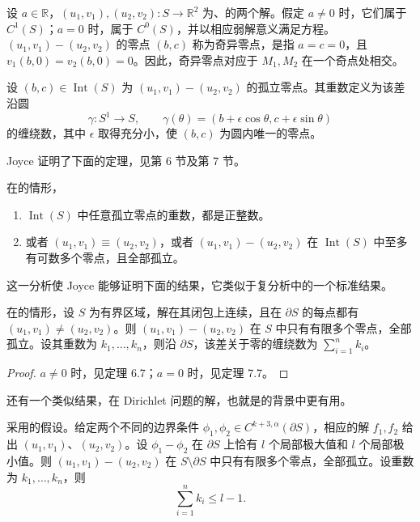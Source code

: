 \begin{definition}\label{def:7.13}
设 $a\in\mathbb R$，$(u_1,v_1),(u_2,v_2)\colon S\to\mathbb R^2$ 为、的两个解。假定 $a\neq0$ 时，它们属于 $C^1(S)$；$a=0$ 时，属于 $C^0(S)$，并以相应弱解意义满足方程。$(u_1,v_1)-(u_2,v_2)$ 的零点 $(b,c)$ 称为奇异零点，是指 $a=c=0$，且 $v_1(b,0)=v_2(b,0)=0$。因此，奇异零点对应于 $M_1,M_2$ 在一个奇点处相交。

设 $(b,c)\in\operatorname{Int}(S)$ 为 $(u_1,v_1)-(u_2,v_2)$ 的孤立零点。其重数定义为该差沿圆
\[
\gamma\colon S^1\longrightarrow S,\qquad
\gamma(\theta)=(b+\epsilon\cos\theta,c+\epsilon\sin\theta)
\]
的缠绕数，其中 $\epsilon$ 取得充分小，使 $(b,c)$ 为圆内唯一的零点。
\end{definition}

Joyce 证明了下面的定理，见第 6 节及第 7 节。
\begin{theorem}\label{thm:7.14}
在的情形，
\begin{enumerate}
\item $\operatorname{Int}(S)$ 中任意孤立零点的重数，都是正整数。
\item 或者 $(u_1,v_1)\equiv(u_2,v_2)$，或者 $(u_1,v_1)-(u_2,v_2)$ 在 $\operatorname{Int}(S)$ 中至多有可数多个零点，且全部孤立。
\end{enumerate}
\end{theorem}

这一分析使 Joyce 能够证明下面的结果，它类似于复分析中的一个标准结果。
\begin{theorem}\label{thm:7.15}
在的情形，设 $S$ 为有界区域，解在其闭包上连续，且在 $\partial S$ 的每点都有 $(u_1,v_1)\neq(u_2,v_2)$。则 $(u_1,v_1)-(u_2,v_2)$ 在 $S$ 中只有有限多个零点，全部孤立。设其重数为 $k_1,\ldots,k_n$，则沿 $\partial S$，该差关于零的缠绕数为 $\sum_{i=1}^nk_i$。
\end{theorem}

\begin{proof}
$a\neq0$ 时，见定理 6.7；$a=0$ 时，见定理 7.7。
\end{proof}

还有一个类似结果，在 Dirichlet 问题的解，也就是的背景中更有用。
\begin{theorem}\label{thm:7.16}
采用的假设。给定两个不同的边界条件 $\phi_1,\phi_2\in C^{k+3,\alpha}(\partial S)$，相应的解 $f_1,f_2$ 给出 $(u_1,v_1)$、$(u_2,v_2)$。设 $\phi_1-\phi_2$ 在 $\partial S$ 上恰有 $l$ 个局部极大值和 $l$ 个局部极小值。则 $(u_1,v_1)-(u_2,v_2)$ 在 $S\setminus\partial S$ 中只有有限多个零点，全部孤立。设重数为 $k_1,\ldots,k_n$，则
\[
\sum_{i=1}^nk_i\leq l-1.
\]
\end{theorem}

